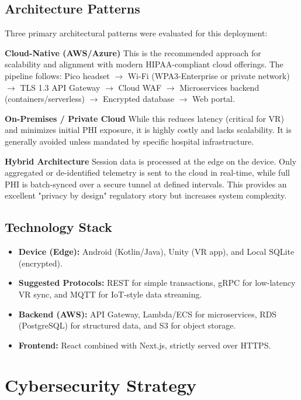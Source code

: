 \documentclass[11pt, letterpaper]{article}
\begin{document}
\subsection{Architecture Patterns}
Three primary architectural patterns were evaluated for this deployment:

\textbf{Cloud-Native (AWS/Azure)}
This is the recommended approach for scalability and alignment with modern HIPAA-compliant cloud offerings. The pipeline follows: Pico headset $\rightarrow$ Wi-Fi (WPA3-Enterprise or private network) $\rightarrow$ TLS 1.3 API Gateway $\rightarrow$ Cloud WAF $\rightarrow$ Microservices backend (containers/serverless) $\rightarrow$ Encrypted database $\rightarrow$ Web portal.

\textbf{On-Premises / Private Cloud}
While this reduces latency (critical for VR) and minimizes initial PHI exposure, it is highly costly and lacks scalability. It is generally avoided unless mandated by specific hospital infrastructure.

\textbf{Hybrid Architecture}
Session data is processed at the edge on the device. Only aggregated or de-identified telemetry is sent to the cloud in real-time, while full PHI is batch-synced over a secure tunnel at defined intervals. This provides an excellent "privacy by design" regulatory story but increases system complexity.

\subsection{Technology Stack}
\begin{itemize}
    \item \textbf{Device (Edge):} Android (Kotlin/Java), Unity (VR app), and Local SQLite (encrypted).
    \item \textbf{Suggested Protocols:} REST for simple transactions, gRPC for low-latency VR sync, and MQTT for IoT-style data streaming.
    \item \textbf{Backend (AWS):} API Gateway, Lambda/ECS for microservices, RDS (PostgreSQL) for structured data, and S3 for object storage.
    \item \textbf{Frontend:} React combined with Next.js, strictly served over HTTPS.
\end{itemize}

\section{Cybersecurity Strategy}
\end{document}
